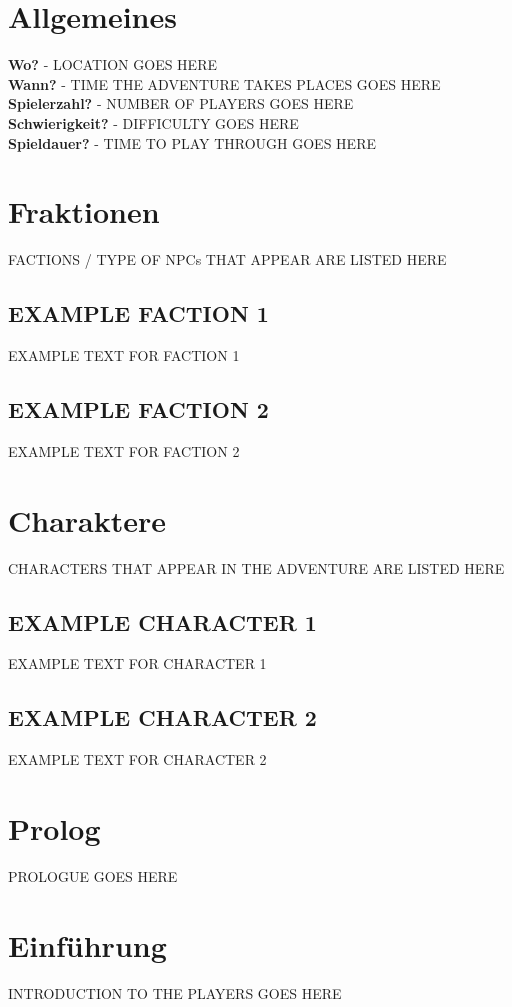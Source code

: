 
\section{Allgemeines}
\textbf{Wo?}            -  LOCATION GOES HERE \\
\textbf{Wann?}          -  TIME THE ADVENTURE TAKES PLACES GOES HERE \\
\textbf{Spielerzahl?}   -  NUMBER OF PLAYERS GOES HERE \\
\textbf{Schwierigkeit?} -  DIFFICULTY GOES HERE \\
\textbf{Spieldauer?}    -  TIME TO PLAY THROUGH GOES HERE

\section{Fraktionen}

FACTIONS / TYPE OF NPCs THAT APPEAR ARE LISTED HERE

\subsection{EXAMPLE FACTION 1}
EXAMPLE TEXT FOR FACTION 1

\subsection{EXAMPLE FACTION 2}
EXAMPLE TEXT FOR FACTION 2

\newpage

\section{Charaktere}

CHARACTERS THAT APPEAR IN THE ADVENTURE ARE LISTED HERE

\subsection{EXAMPLE CHARACTER 1}
EXAMPLE TEXT FOR CHARACTER 1

\subsection{EXAMPLE CHARACTER 2}
EXAMPLE TEXT FOR CHARACTER 2

\newpage

\section{Prolog}

PROLOGUE GOES HERE

\section{Einführung}

INTRODUCTION TO THE PLAYERS GOES HERE
